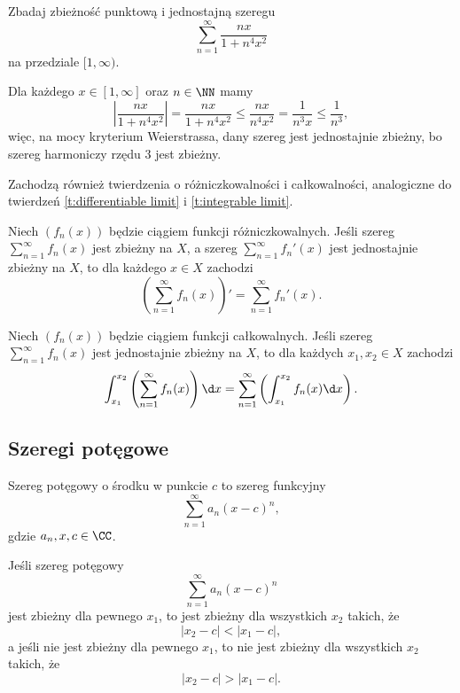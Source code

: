 \begin{example}
    Zbadaj zbieżność punktową i jednostajną szeregu
    \[ \sum_{n=1}^\infty \frac{nx}{1+n^4x^2} \]
    na przedziale $[1,\infty)$.
\end{example}
\begin{solution}
    Dla każdego $x \in [1, \infty]$ oraz $n \in \NN$ mamy
    \[ \left|\frac{nx}{1+n^4x^2}\right| = \frac{nx}{1+n^4x^2} \leq \frac{nx}{n^4x^2} = \frac{1}{n^3x} \leq \frac{1}{n^3}, \]
    więc, na mocy kryterium Weierstrassa, dany szereg jest jednostajnie zbieżny, bo szereg harmoniczy rzędu $3$ jest zbieżny.
\end{solution}

Zachodzą również twierdzenia o różniczkowalności i całkowalności, analogiczne do twierdzeń \ref{t:differentiable limit} i \ref{t:integrable limit}.

\begin{theorem}
    \label{t:differentiable series}
    Niech $(f_n(x))$ będzie ciągiem funkcji różniczkowalnych. Jeśli szereg $\sum_{n=1}^\infty f_n(x)$ jest zbieżny na $X$, a szereg $\sum_{n=1}^\infty f_n'(x)$ jest jednostajnie zbieżny na $X$, to dla każdego $x \in X$ zachodzi
    \[ \left(\sum_{n=1}^\infty f_n(x)\right)' = \sum_{n=1}^\infty f_n'(x). \]
\end{theorem}

\begin{theorem}
    \label{t:integrable series}
    Niech $(f_n(x))$ będzie ciągiem funkcji całkowalnych. Jeśli szereg $\sum_{n=1}^\infty f_n(x)$ jest jednostajnie zbieżny na $X$, to dla każdych $x_1, x_2 \in X$ zachodzi
    \[ \int_{x_1}^{x_2}\left(\sum_{n=1}^\infty f_n(x)\right)\d x = \sum_{n=1}^\infty \left(\int_{x_1}^{x_2}f_n(x)\d x\right). \]
\end{theorem}

\subsection{Szeregi potęgowe}
\begin{definition}
    \label{d:power series}
    Szereg potęgowy o środku w punkcie $c$ to szereg funkcyjny
    \[ \sum_{n=1}^\infty a_n(x - c)^n, \]
    gdzie $a_n, x, c \in \CC$.
\end{definition}

\begin{theorem}
    Jeśli szereg potęgowy
    \[ \sum_{n=1}^\infty a_n(x - c)^n \]
    jest zbieżny dla pewnego $x_1$, to jest zbieżny dla wszystkich $x_2$ takich, że
    \[ |x_2 - c| < |x_1 - c|, \]
    a jeśli nie jest zbieżny dla pewnego $x_1$, to nie jest zbieżny dla wszystkich $x_2$ takich, że
    \[ |x_2 - c| > |x_1 - c|. \]
\end{theorem}

